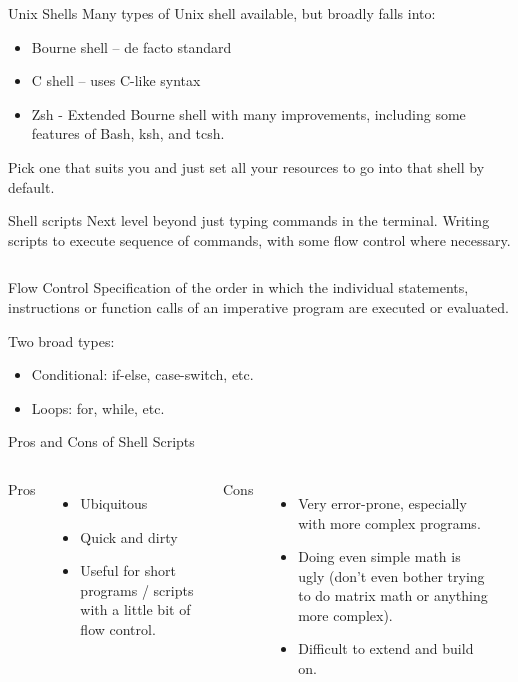 \documentclass[aspectratio=169]{beamer}
\begin{document}
\begin{frame}{Unix Shells}
Many types of Unix shell available, but broadly falls into:
\begin{itemize}
    \item Bourne shell – de facto standard
    \item C shell – uses C-like syntax
    \item Zsh - Extended Bourne shell with many improvements, including some features of Bash, ksh, and tcsh.
\end{itemize}

Pick one that suits you and just set all your resources to go into that shell by default.

\end{frame} 

\begin{frame}[fragile]{Shell scripts}
Next level beyond just typing commands in the terminal. Writing scripts to execute sequence of commands, with some flow control where necessary.

\inputminted{bash}{code/9_unix_for.sh}
\end{frame} 

\begin{frame}{Flow Control}
Specification of the order in which the individual statements, instructions or function calls of an imperative program are executed or evaluated.

Two broad types:
\begin{itemize}
    \item Conditional: if-else, case-switch, etc.
    \item Loops: for, while, etc.
\end{itemize}

\end{frame} 

\begin{frame}{Pros and Cons of Shell Scripts}
\begin{columns}
Pros
\begin{itemize}
\item Ubiquitous
\item Quick and dirty
\item Useful for short programs / scripts with a little bit of flow control.
\end{itemize}

Cons

\begin{itemize}
 \item Very error-prone, especially with more complex programs.
     \item Doing even simple math is ugly (don’t even bother trying to do matrix math or anything more complex).
     \item Difficult to extend and build on.
 \end{itemize}


\inputminted{bash}{code/9_expr.sh}

\end{columns} 

\end{frame} 
\end{document}
